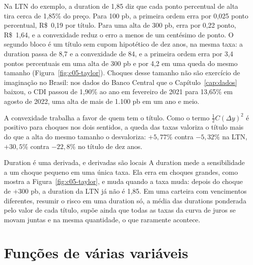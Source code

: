 Na LTN do exemplo, a duration de 1,85 diz que cada ponto percentual de alta tira cerca de 1,85\% do preço. Para 100 pb, a primeira ordem erra por 0,025 ponto percentual, R\$~0,19 por título. Para uma alta de 300 pb, erra por 0,22 ponto, R\$~1,64, e a convexidade reduz o erro a menos de um centésimo de ponto. O segundo bloco é um título sem cupom hipotético de dez anos, na mesma taxa: a duration passa de 8,7 e a convexidade de 84, e a primeira ordem erra por 3,4 pontos percentuais em uma alta de 300 pb e por 4,2 em uma queda do mesmo tamanho (Figura~\ref{fig:c05-taylor}). Choques desse tamanho não são exercício de imaginação no Brasil: nos dados do Banco Central que o Capítulo~\ref{cap:dados} baixou, o CDI passou de 1,90\% ao ano em fevereiro de 2021 para 13,65\% em agosto de 2022, uma alta de mais de 1.100 pb em um ano e meio.


A convexidade trabalha a favor de quem tem o título. Como o termo $\tfrac12 C (\Delta y)^2$ é positivo para choques nos dois sentidos, a queda das taxas valoriza o título mais do que a alta do mesmo tamanho o desvaloriza: $+5,77\%$ contra $-5,32\%$ na LTN, $+30,5\%$ contra $-22,8\%$ no título de dez anos.

\begin{armadilha}{Duration é uma derivada, e derivadas são locais}
A duration mede a sensibilidade a um choque pequeno em uma única taxa. Ela erra em choques grandes, como mostra a Figura~\ref{fig:c05-taylor}, e muda quando a taxa muda: depois do choque de $+300$ pb, a duration da LTN já não é 1,85. Em uma carteira com vencimentos diferentes, resumir o risco em uma duration só, a média das durations ponderada pelo valor de cada título, supõe ainda que todas as taxas da curva de juros se movam juntas e na mesma quantidade, o que raramente acontece.
\end{armadilha}

\section{Funções de várias variáveis}
\label{sec:c05-parciais}

